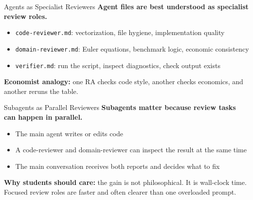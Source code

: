 \documentclass[10pt,english,aspectratio=169]{beamer}
\begin{document}
\begin{frame}{Agents as Specialist Reviewers}
\textbf{Agent files are best understood as specialist review roles.}

\vspace{0.25cm}

\begin{itemize}
    \item \texttt{code-reviewer.md}: vectorization, file hygiene, implementation quality
    \item \texttt{domain-reviewer.md}: Euler equations, benchmark logic, economic consistency
    \item \texttt{verifier.md}: run the script, inspect diagnostics, check output exists
\end{itemize}

\vspace{0.3cm}

\textbf{Economist analogy:} one RA checks code style, another checks economics, and another reruns the table.
\end{frame}

\begin{frame}{Subagents as Parallel Reviewers}
\textbf{Subagents matter because review tasks can happen in parallel.}

\vspace{0.25cm}

\begin{itemize}
    \item The main agent writes or edits code
    \item A code-reviewer and domain-reviewer can inspect the result at the same time
    \item The main conversation receives both reports and decides what to fix
\end{itemize}

\vspace{0.25cm}

\textbf{Why students should care:} the gain is not philosophical. It is wall-clock time. Focused review roles are faster and often clearer than one overloaded prompt.
\end{frame}
\end{document}
